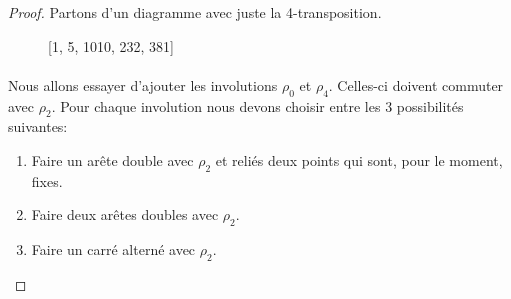 \begin{proof}
  Partons d'un diagramme avec juste la 4-transposition.

  \begin{figure}[H]
    \begin{center}
      \caption{[1, 5, 1010, 232, 381]}
    \end{center}
  \end{figure}

\paragraph{}
Nous allons essayer d'ajouter les involutions $\rho_0$ et $\rho_4$. Celles-ci doivent commuter avec $\rho_2$. Pour chaque involution nous devons choisir entre les 3 possibilités suivantes:
\begin{enumerate}
  \item Faire un arête double avec $\rho_2$ et reliés deux points qui sont, pour le moment, fixes.
  \item Faire deux arêtes doubles avec $\rho_2$.
  \item Faire un carré alterné avec $\rho_2$.
\end{enumerate}


\end{proof}
